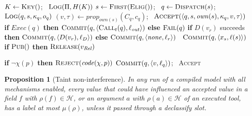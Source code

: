 \documentclass[pdflatex,sn-mathphys-num]{sn-jnl}
\theoremstyle{thmstyleone}%
\newtheorem{proposition}[theorem]{Proposition}%
\theoremstyle{thmstyletwo}%
\theoremstyle{thmstylethree}%
\begin{document}
\begin{algorithm}[htbp]
\caption{$\textsc{Run}(P, X)$: mediated execution of plan $P$ on inputs $X$.}\label{alg:run}
\small\begin{algorithmic}[1]
\State $K \gets \textsc{Key}()$; \ $\textsc{Log}(\Pi, H(K))$
  \State $s \gets \textsc{First}(\textsc{Elig}())$; \ $q \gets \textsc{Dispatch}(s)$; \ $\textsc{Log}(q, s, \kappa_q, o_q)$
    \State $(v, \tau) \gets \mathit{prop}_{\mathit{own}(s)}(C_q, c_q)$; \ $\textsc{Accept}(\langle q, s, \mathit{own}(s), \kappa_q, v, \tau \rangle)$ 
    \State \textbf{if} $\mathit{Exec}(q)$ \textbf{then} $\textsc{Commit}(q, \langle \textsc{Call}_t(q), \ell_{\mathit{out}} \rangle)$ \textbf{else} $\textsc{Fail}(q)$ 
    \State \textbf{if} $D(v_r)$ succeeds \textbf{then} $\textsc{Commit}(q, \langle D(v_r), \ell_D \rangle)$ \textbf{else} $\textsc{Commit}(q, \langle \mathit{none}, \ell_r \rangle)$
  \Else\ $\textsc{Commit}(q, \langle x_s, \ell(s) \rangle)$ 
  \EndIf
\EndWhile
\State \textbf{if} $\textsc{Pub}()$ \textbf{then} $\textsc{Release}(v_{\mathit{Rel}})$ 
\end{algorithmic}
\end{algorithm}

\begin{algorithm}[htbp]
\caption{$\textsc{Accept}(p)$ for a proposal $p = \langle q, s, a, \kappa, v, \tau \rangle$.}\label{alg:accept}
\small\begin{algorithmic}[1]
  \State \textbf{if} $\neg \chi(p)$ \textbf{then} \Return $\textsc{Reject}(\mathit{code}(\chi, p))$
\EndFor
\State $\textsc{Commit}(q, \langle v, \ell_q \rangle)$; \ \Return \textsc{Accept}
\end{algorithmic}
\end{algorithm}

\begin{proposition}[Taint non-interference]\label{prop:ni}
In any run of a compiled model with all mechanisms enabled, every value that could have influenced an accepted value in a field $f$ with $\rho(f) \in \mathcal{H}$, or an argument $a$ with $\rho(a) \in \mathcal{H}$ of an executed tool, has a label at most $\mu(\rho)$, unless it passed through a declassify slot.
\end{proposition}
\end{document}
